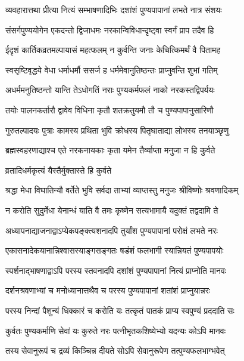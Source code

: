 \twolineshloka
{व्यवहारात्तथा प्रीत्या नित्यं सम्भाषणादिभिः}
{दशांशं पुण्यपापानां लभते नात्र संशयः} %

\twolineshloka
{संसर्गपुण्ययोगेन एकदन्तो द्विजाधमः}
{नरकान्विविधान्दृष्ट्वा स्वर्गं प्राप तदैव हि} %


\twolineshloka
{ईदृशं कार्तिकव्रतमल्पायासं महत्फलम्}
{न कुर्वन्ति जनाः केचित्किमर्थं वै पितामह} %


\twolineshloka
{स्वसृष्टिवृद्धये वेधा धर्माधर्मौ ससर्ज ह}
{धर्ममेवानुतिष्ठन्तः प्राप्नुवन्ति शुभां गतिम्} %

\twolineshloka
{अधर्ममनुतिष्ठन्तो यान्ति तेऽधोगतिं नराः}
{पुण्यकर्मफलं नाको नरकस्तद्विपर्ययः} %

\twolineshloka
{तयोः पालनकर्तारौ द्वावेव विधिना कृतौ}
{शतक्रतुयमौ तौ च पुण्यपापानुसारिणौ} %

\twolineshloka
{गुरुतल्पादयः पुत्राः कामस्य प्रथिता भुवि}
{क्रोधस्य पितृघाताद्या लोभस्य तनयाञ्छृणु} %

\twolineshloka
{ब्रह्मस्वहरणाद्याश्च एते नरकनायकाः}
{कृता यमेन तैर्व्याप्ता मनुजा न हि कुर्वते} %


\onelineshloka
{व्रतादिधर्मकृत्यं यैस्तैर्मुक्तास्ते हि कुर्वते} %

\twolineshloka
{श्रद्धा मेधा विघातिन्यौ वर्तेते भुवि सर्वदा}
{ताभ्यां व्याप्तस्तु मनुजः श्रीविष्णोः श्रवणादिकम्} %

\twolineshloka
{न करोति सुदुर्मेधा येनान्धं याति वै तमः}
{कृष्णेन सत्यभामायै यदुक्तं तद्वदामि ते} %

\twolineshloka
{अध्यापनाद्याजनाद्वाऽप्येकपङ्क्त्यशनादपि}
{तुर्यांश पुण्यपापानां परोक्षं लभते नरः} %

\twolineshloka
{एकासनादेकयानान्निश्वासस्याङ्गसङ्गतः}
{षडंशं फलभागी स्यान्नियतं पुण्यपापयोः} %

\twolineshloka
{स्पर्शनाद्भाषणाद्वाऽपि परस्य स्तवनादपि}
{दशांशं पुण्यपापानां नित्यं प्राप्नोति मानवः} %

\twolineshloka
{दर्शनश्रवणाभ्यां च मनोध्यानात्तथैव च}
{परस्य पुण्यपापानां शतांशं प्राप्नुयान्नरः} %

\twolineshloka
{परस्य निन्दां पैशुन्यं धिक्कारं च करोति यः}
{तत्कृतं पातकं प्राप्य स्वपुण्यं प्रददाति सः} %

\twolineshloka
{कुर्वतः पुण्यकर्माणि सेवां यः कुरुते नरः}
{पत्नीभृतकशिष्येभ्यो यदन्यः कोऽपि मानवः} %

\twolineshloka
{तस्य सेवानुरूपं च द्रव्यं किञ्चिन्न दीयते}
{सोऽपि सेवानुरूपेण तत्पुण्यफलभाग्भवेत्} %


